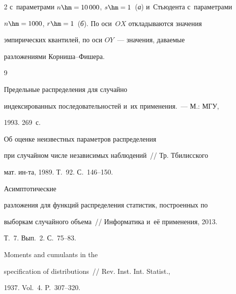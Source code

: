 \begin{multicols}{2}
с~параметрами $n\hm=10\,000$, $s\hm=1$~(\textit{а}) и~Стьюдента с~параметрами

$n\hm=1000$, $r\hm=1$~(\textit{б}). По оси~$OX$ откладываются значения

эмпирических квантилей, по оси $OY$~--- значения, даваемые

разложениями Кор\-ни\-ша--Фи\-шера.



\vspace*{-6pt}



{\small\frenchspacing

 {%


 \begin{thebibliography}{9}


 Предельные распределения для случайно

индексированных последовательностей и~их применения.~--- М.: МГУ,

1993. 269~с.



\columnbreak




 Об оценке неизвестных параметров распределения

при случайном числе независимых наблюдений~// Тр. Тбилисского

мат. ин-та, 1989. Т.~92. С.~146--150.




   Асимптотические

разложения для функций распределения статистик, построенных по

выборкам случайного объема~// Информатика и~её применения, 2013.

Т.~7. Вып.~2. С.~75--83.




  Moments and cumulants in the

specification of distributions~// Rev. Inst. Int. Statist.,

1937. Vol.~4. P.~307--320.




\end{thebibliography}}}
\end{multicols}
